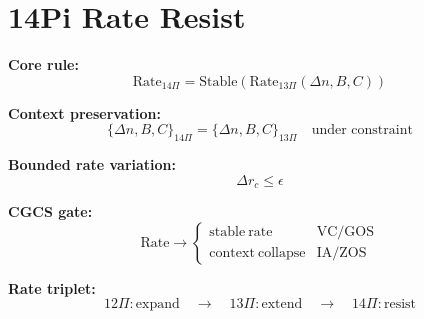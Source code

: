 \section*{14Pi Rate Resist}

\textbf{Core rule:}
\[
\mathrm{Rate}_{14\Pi}
=
\mathrm{Stable}\left(\mathrm{Rate}_{13\Pi}(\Delta n,B,C)\right)
\]

\textbf{Context preservation:}
\[
\{\Delta n, B, C\}_{14\Pi}
=
\{\Delta n, B, C\}_{13\Pi}
\quad \text{under constraint}
\]

\textbf{Bounded rate variation:}
\[
\Delta r_c \leq \epsilon
\]

\textbf{CGCS gate:}
\[
\mathrm{Rate} \rightarrow
\begin{cases}
\mathrm{stable\ rate} & \text{VC/GOS} \\
\mathrm{context\ collapse} & \text{IA/ZOS}
\end{cases}
\]

\textbf{Rate triplet:}
\[
12\Pi:\mathrm{expand}
\quad\rightarrow\quad
13\Pi:\mathrm{extend}
\quad\rightarrow\quad
14\Pi:\mathrm{resist}
\]
